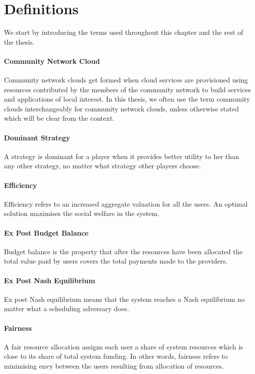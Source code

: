 
\section{Definitions}
\label{sec__Definitions}

We start by introducing the terms used throughout this chapter and the rest of the thesis.


\paragraph{Community Network Cloud}
Community network clouds get formed when cloud services are provisioned using resources contributed by the 
members of the community network to build services and applications of local interest.
In this thesis, we often use the term community clouds interchangeably 
for community network clouds, 
unless otherwise stated which will be clear from the context.

\paragraph{Dominant Strategy} A strategy is dominant for a player 
when it provides better utility to her than any other strategy, 
no matter what strategy other players choose.

\paragraph{Efficiency}
Efficiency refers to an increased aggregate valuation for all the users.
An optimal solution maximises the social welfare in the system.

\paragraph{Ex Post Budget Balance}
Budget balance is the property that after the resources have been allocated the total value paid by users covers the total payments made to the providers.

\paragraph{Ex Post Nash Equilibrium}
Ex post Nash equilibrium means that the system reaches a Nash equilibrium no matter what a scheduling adversary does.

\paragraph{Fairness}
A fair resource allocation assigns each user a share of system resources which is close to its share of total system funding. 
In other words, fairness refers to minimising envy between the users resulting from allocation of resources.


